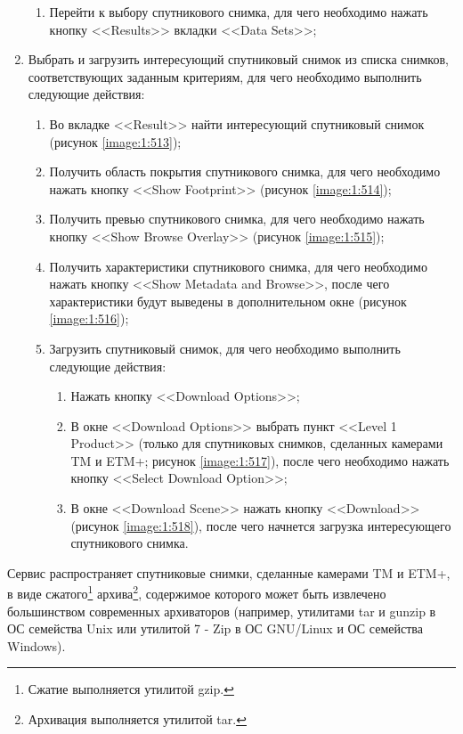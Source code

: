 \begin{enumerate}
\begin{enumerate}
			\item Перейти к выбору спутникового снимка, для чего необходимо нажать кнопку \linebreak <<Results>> вкладки <<Data Sets>>;

		\end{enumerate}

	\item Выбрать и загрузить интересующий спутниковый снимок из списка снимков, соответствующих заданным критериям, для чего необходимо выполнить следующие действия:

		\begin{enumerate}

			\item Во вкладке <<Result>> найти интересующий спутниковый снимок (рисунок \ref{image:1:513});
			\item Получить область покрытия спутникового снимка, для чего необходимо нажать кнопку <<Show Footprint>> (рисунок \ref{image:1:514});
			\item Получить превью спутникового снимка, для чего необходимо нажать кнопку <<Show Browse Overlay>> (рисунок \ref{image:1:515});
			\item Получить характеристики спутникового снимка, для чего необходимо нажать кнопку <<Show Metadata and Browse>>, после чего характеристики будут выведены в дополнительном окне (рисунок \ref{image:1:516});
			\item Загрузить спутниковый снимок, для чего необходимо выполнить следующие действия:

			\begin{enumerate}

				\item Нажать кнопку <<Download Options>>;
				\item В окне <<Download Options>> выбрать пункт <<Level 1 Product>> (только для спутниковых снимков, сделанных камерами TM и ETM+; рисунок \ref{image:1:517}), после чего необходимо нажать кнопку <<Select Download Option>>;
				\item В окне <<Download Scene>> нажать кнопку <<Download>> (рисунок \ref{image:1:518}), после чего начнется загрузка интересующего спутникового снимка.

			\end{enumerate}

		\end{enumerate}

\end{enumerate}

Сервис \ee распространяет спутниковые снимки, сделанные камерами TM и ETM+, в виде сжатого\footnote{Сжатие выполняется утилитой gzip.} архива\footnote{Архивация выполняется утилитой tar.}, содержимое которого может быть извлечено большинством современных архиваторов (например, утилитами tar и gunzip в ОС семейства Unix или утилитой 7 - Zip в ОС GNU/Linux и ОС семейства Windows).

